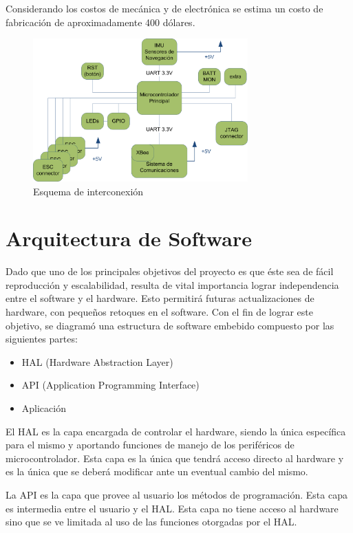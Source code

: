 \documentclass[a4paper, conference]{IEEEtran}
\begin{document}
Considerando los costos de mecánica y de electrónica se estima un costo de fabricación de aproximadamente 400 dólares.

\begin{figure}[btp]
\centering
\includegraphics[width=3.25in]{interconexion.png}
\caption{Esquema de interconexión}
\label{ref:conexiones}
\end{figure}

\vspace{5 mm}

\section{Arquitectura de Software}
Dado que uno de los principales objetivos del proyecto es que éste sea de fácil reproducción y escalabilidad, resulta de vital importancia lograr independencia entre el software y el hardware. Esto permitirá futuras actualizaciones de hardware, con pequeños retoques en el software. Con el fin de lograr este objetivo, se diagramó una estructura de software embebido compuesto por las siguientes partes:
\begin{itemize}
\item HAL (Hardware Abstraction Layer)
\item API  (Application Programming Interface)
\item Aplicación 
\end{itemize}

El HAL es la capa encargada de controlar el hardware, siendo la única específica para el mismo y aportando funciones de manejo de los periféricos de microcontrolador. Esta capa es la única que tendrá acceso directo al hardware y es la única que se deberá modificar ante un eventual cambio del mismo.

La API es la capa que provee al usuario los métodos de programación. Esta capa es intermedia entre el usuario y el HAL. Esta capa no tiene acceso al hardware sino que se ve limitada al uso de las funciones otorgadas por el HAL.
\end{document}
